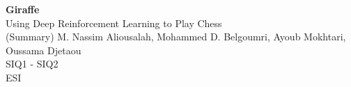 \documentclass[12pt, a4paper]{article}
\begin{document}
	
\begin{titlepage}
    \begin{center}
        \vspace*{6cm}
        \Huge
        \textbf{Giraffe\\}
        \vspace{1cm}
        \LARGE
        Using Deep Reinforcement Learning to Play Chess\\
		(Summary)
        \vfill
        M. Nassim Aliousalah, Mohammed D. Belgoumri, Ayoub Mokhtari, Oussama Djetaou\\
		\vspace{1.5cm}
        \Large
        SIQ1 - SIQ2\\
        ESI\\
    \end{center}
\end{titlepage}
	\newpage
	\vspace*{3cm}
    \tableofcontents
    \newpage
	
	
	
	
\end{document}

